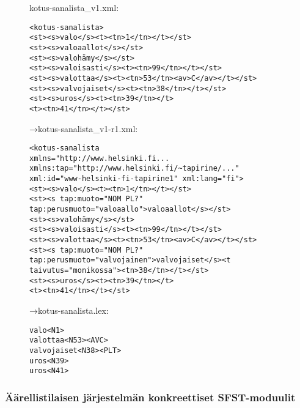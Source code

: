 \documentclass[free]{flammie}
\begin{document}
\begin{figure}
    \label{XSLT-muunnoksen vaiheita}

kotus-sanalista\_v1.xml:\\
    \begin{verbatim}
<kotus-sanalista>
<st><s>valo</s><t><tn>1</tn></t></st>
<st><s>valoaallot</s></st>
<st><s>valohämy</s></st>
<st><s>valoisasti</s><t><tn>99</tn></t></st>
<st><s>valottaa</s><t><tn>53</tn><av>C</av></t></st>
<st><s>valvojaiset</s><t><tn>38</tn></t></st>
<st><s>uros</s><t><tn>39</tn></t>
<t><tn>41</tn></t></st>
    \end{verbatim}
→kotus-sanalista\_v1-r1.xml:\\
    \begin{verbatim}
<kotus-sanalista
xmlns="http://www.helsinki.fi...
xmlns:tap="http://www.helsinki.fi/~tapirine/..."
xml:id="www-helsinki-fi-tapirine1" xml:lang="fi">
<st><s>valo</s><t><tn>1</tn></t></st>
<st><s tap:muoto="NOM PL?"
tap:perusmuoto="valoaallo">valoaallot</s></st>
<st><s>valohämy</s></st>
<st><s>valoisasti</s><t><tn>99</tn></t></st>
<st><s>valottaa</s><t><tn>53</tn><av>C</av></t></st>
<st><s tap:muoto="NOM PL?"
tap:perusmuoto="valvojainen">valvojaiset</s><t
taivutus="monikossa"><tn>38</tn></t></st>
<st><s>uros</s><t><tn>39</tn></t>
<t><tn>41</tn></t></st>
    \end{verbatim}
→kotus-sanalista.lex:\\
    \begin{verbatim}
valo<N1>
valottaa<N53><AVC>
valvojaiset<N38><PLT>
uros<N39>
uros<N41>
    \end{verbatim}
\end{figure}

\subsubsection{Äärellistilaisen järjestelmän konkreettiset SFST-moduulit}
\end{document}
